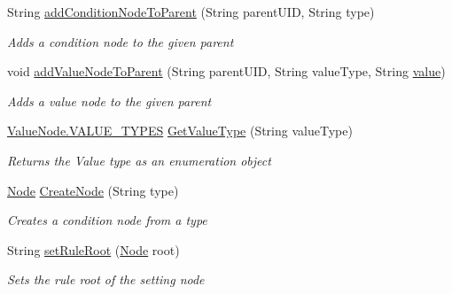 \begin{DoxyCompactItemize}
String \hyperlink{class_web_analyzer_1_1_u_i_1_1_interaction_objects_1_1_rule_control_a1493baf16bd16f82f894a41532871a6b}{add\+Condition\+Node\+To\+Parent} (String parent\+U\+I\+D, String type)
\begin{DoxyCompactList}\small\item\em Adds a condition node to the given parent \end{DoxyCompactList}\item 
void \hyperlink{class_web_analyzer_1_1_u_i_1_1_interaction_objects_1_1_rule_control_af73da3f329b8bee6d51820775c7cd123}{add\+Value\+Node\+To\+Parent} (String parent\+U\+I\+D, String value\+Type, String \hyperlink{_u_i_2_h_t_m_l_resources_2js_2lib_2underscore_8min_8js_af7e1471ab89699458c4df8bb657298f6}{value})
\begin{DoxyCompactList}\small\item\em Adds a value node to the given parent \end{DoxyCompactList}\item 
\hyperlink{class_web_analyzer_1_1_models_1_1_settings_model_1_1_expression_tree_1_1_value_node_ac18254d82bd6e0d754ed1a2484882d11}{Value\+Node.\+V\+A\+L\+U\+E\+\_\+\+T\+Y\+P\+E\+S} \hyperlink{class_web_analyzer_1_1_u_i_1_1_interaction_objects_1_1_rule_control_a32364cefe278f4e48c1b6ecf1f33d0f6}{Get\+Value\+Type} (String value\+Type)
\begin{DoxyCompactList}\small\item\em Returns the Value type as an enumeration object \end{DoxyCompactList}\item 
\hyperlink{class_web_analyzer_1_1_models_1_1_settings_model_1_1_expression_tree_1_1_node}{Node} \hyperlink{class_web_analyzer_1_1_u_i_1_1_interaction_objects_1_1_rule_control_a145ac475b9d6d3024b351e30bc6b2bdc}{Create\+Node} (String type)
\begin{DoxyCompactList}\small\item\em Creates a condition node from a type \end{DoxyCompactList}\item 
String \hyperlink{class_web_analyzer_1_1_u_i_1_1_interaction_objects_1_1_rule_control_aa85c27cdc071305cd73a0d336c4f95a5}{set\+Rule\+Root} (\hyperlink{class_web_analyzer_1_1_models_1_1_settings_model_1_1_expression_tree_1_1_node}{Node} root)
\begin{DoxyCompactList}\small\item\em Sets the rule root of the setting node \end{DoxyCompactList}\end{DoxyCompactItemize}
